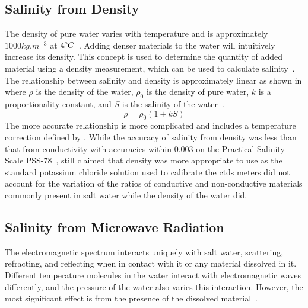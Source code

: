 \subsection{Salinity from Density}

The density of pure water varies with temperature and is approximately $1000 kg.m^{-3}$ at $4\degree C$~\cite{USGS_water_density_2018}.
Adding denser materials to the water will intuitively increase its density.
This concept is used to determine the quantity of added material using a density measurement, which can be used to calculate salinity~\cite{kjerfve_salinity_measurement_overview_1983}.
The relationship between salinity and density is approximately linear as shown in  where $\rho$ is the density of the water, $\rho_0$ is the density of pure water, $k$ is a proportionality constant, and $S$ is the salinity of the water~\cite{uow_oceanography_research_1966}.
\begin{equation}\label{eqn:salinity-density}
    \rho = \rho_0(1 + kS)
\end{equation}
The more accurate relationship is more complicated and includes a temperature correction defined by .
While the accuracy of salinity from density was less than that from conductivity with accuracies within $0.003$ on the Practical Salinity Scale PSS-78~\cite{millero_international_one_atmosphere_eos_seawater_1981},  still claimed that density was more appropriate to use as the standard potassium chloride solution used to calibrate the \glspl{ctd} meters did not account for the variation of the ratios of conductive and non-conductive materials commonly present in salt water while the density of the water did.

\subsection{Salinity from Microwave Radiation}

The electromagnetic spectrum interacts uniquely with salt water, scattering, refracting, and reflecting when in contact with it or any material dissolved in it.
Different temperature molecules in the water interact with electromagnetic waves differently, and the pressure of the water also varies this interaction. However, the most significant effect is from the presence of the dissolved material~\cite{swift_considerations_for_microwave_salinity_1983}.

